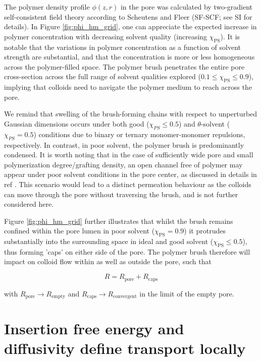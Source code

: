 \documentclass[12pt, a4paper]{article}
\begin{document}
The polymer density profile $\phi(z,r)$ in the pore was calculated by two-gradient self-consistent field theory according to Scheutens and Fleer (SF-SCF; see SI for details).
In Figure \ref{fig:phi_hm_grid}, one can appreciate the expected increase in polymer concentration with decreasing solvent quality (increasing $\chi_{\text{PS}}$). 
It is notable that the variations in polymer concentration as a function of solvent strength are substantial, 
and that the concentration is more or less homogeneous across the polymer-filled space. 
The polymer brush penetrates the entire pore cross-section across the full range of solvent qualities explored ($0.1\le\chi_{\text{PS}}\le0.9$), 
implying that colloids need to navigate the polymer medium to reach across the pore.

We remind that swelling of the brush-forming chains with respect to unperturbed Gaussian dimensions occurs under both good ($\chi_{PS} \leq 0.5$) and $\theta$-solvent ($\chi_{PS}= 0.5$) conditions due to binary or ternary monomer-monomer repulsions, respectively.
In contrast, in poor solvent, the polymer brush is predominantly condensed.
It is worth noting that in the case of sufficiently wide pore and small polymerization degree/grafting density, 
an open channel free of polymer may appear under poor solvent conditions in the pore center, as discussed in details in ref \cite{Laktionov2021}. 
This scenario would lead to a distinct permeation behaviour as the colloids can move through the pore without traversing the brush, and is not further considered here. 

Figure \ref{fig:phi_hm_grid} further illustrates that whilst the brush remains confined within the pore lumen in poor solvent ($\chi_{\text{PS}}=0.9$) 
it protrudes substantially into the surrounding space in ideal and good solvent ($\chi_{\text{PS}}\le0.5$), thus forming 'caps' on either side of the pore.  
The polymer brush therefore will impact on colloid flow within as well as outside the pore, such that

\begin{equation}
    R=R_{\text{pore}}+R_{\text{caps}}
    \label{eq:R_tot_tot}
\end{equation}
    
\noindent with $R_{\text{pore}}\rightarrow R_{\text{empty}}$ and $R_{\text{caps}}\rightarrow R_{\text{convergent}}$ in the limit of the empty pore. 


\section{Insertion free energy and diffusivity define transport locally}
\end{document}
